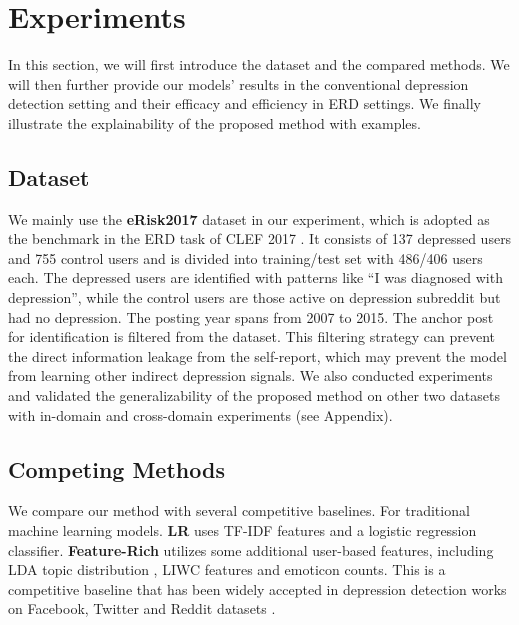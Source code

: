 \section{Experiments}

In this section, we will first introduce the dataset and the compared methods. We will then further provide our models' results in the conventional depression detection setting and their efficacy and efficiency in ERD settings. We finally illustrate the explainability of the proposed method with examples.

\subsection{Dataset}

We mainly use the \textbf{eRisk2017} dataset \cite{losada2016test} in our experiment, which is adopted as the benchmark in the ERD task of CLEF 2017 \cite{losada2017erisk}. It consists of 137 depressed users and 755 control users and is divided into training/test set with 486/406 users each. The depressed users are identified with patterns like ``I was diagnosed with depression'', while the control users are those active on depression subreddit but had no depression. The posting year spans from 2007 to 2015. The anchor post for identification is filtered from the dataset. This filtering strategy can prevent the direct information leakage from the self-report, which may prevent the model from learning other indirect depression signals. We also conducted experiments and validated the generalizability of the proposed method on other two datasets with in-domain and cross-domain experiments (see Appendix). 

\subsection{Competing Methods}
We compare our method with several competitive baselines. For traditional machine learning models. \textbf{LR} uses TF-IDF features and a logistic regression classifier. \textbf{Feature-Rich} utilizes some additional user-based features, including LDA topic distribution \cite{blei2003latent}, LIWC features \cite{pennebaker2001linguistic} and emoticon counts. This is a competitive baseline that has been widely accepted in depression detection works on Facebook, Twitter and Reddit datasets \cite{eichstaedt2018facebook,trotzek2018utilizing,harrigian2020models}.

